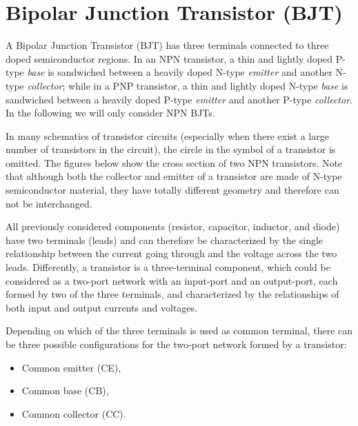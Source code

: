 \section*{Bipolar Junction Transistor (BJT)} 

A Bipolar Junction Transistor (BJT) has three terminals connected to three
doped semiconductor regions. In an NPN transistor, a thin and lightly doped 
P-type {\em base} is sandwiched between a heavily doped N-type {\em emitter}
and another N-type {\em collector}; while in a PNP transistor, a thin and 
lightly doped N-type {\em base} is sandwiched between a heavily doped P-type
{\em emitter} and another P-type {\em collector}. In the following we will 
only consider NPN BJTs.



In many schematics of transistor circuits (especially when there exist a
large number of transistors in the circuit), the circle in the symbol of
a transistor is omitted. The figures below show the cross section of two
NPN transistors. Note that although both the collector and emitter of a
transistor are made of N-type semiconductor material, they have totally
different geometry and therefore can not be interchanged.



All previously considered components (resistor, capacitor, inductor, and 
diode) have two terminals (leads) and can therefore be characterized by 
the single relationship between the current going through and the voltage 
across the two leads. Differently, a transistor is a three-terminal component,
which could be considered as a two-port network with an input-port and an
output-port, each formed by two of the three terminals, and characterized
by the relationships of both input and output currents and voltages.

Depending on which of the three terminals is used as common terminal, there
can be three possible configurations for the two-port network formed by a
transistor: 
\begin{itemize}
\item Common emitter (CE), 
\item Common base (CB), 
\item Common collector (CC).
\end{itemize}

